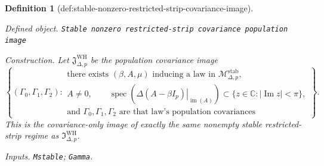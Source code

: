 \documentclass{article}
\newtheorem{definition}{Definition}
\begin{document}
\begin{definition}[def:stable-nonzero-restricted-strip-covariance-image]\label{def:stable-nonzero-restricted-strip-covariance-image}
\par\smallskip\noindent\emph{Defined object.} \texttt{Stable nonzero restricted-\allowbreak{}strip covariance population image}
\par\smallskip\noindent\emph{Construction.} Let \(\mathfrak J_{\Delta,p}^{\mathrm{WH}}\) be the population covariance image
\[
 \left\{(\Gamma_0,\Gamma_1,\Gamma_2):\begin{array}{l}
 \text{there exists }(\beta,A,\mu)\text{ inducing a law in }\mathcal M_{\Delta,p}^{\mathrm{stab}},\\
 A\neq0,\qquad
 \operatorname{spec}\!\left(\left.\Delta(A-\beta I_p)\right|_{\operatorname{im}(A)}\right)
 \subset\{z\in\mathbb C:|\operatorname{Im}z|<\pi\},\\
 \text{and }\Gamma_0,\Gamma_1,\Gamma_2\text{ are that law's population covariances}
 \end{array}\right\}.
\]
This is the covariance-only image of exactly the same nonempty stable restricted-strip regime as \(\mathfrak I_{\Delta,p}^{\mathrm{WH}}\).
\par\smallskip\noindent\emph{Inputs.} \texttt{Mstable}; \texttt{Gamma}.
\end{definition}
\end{document}
